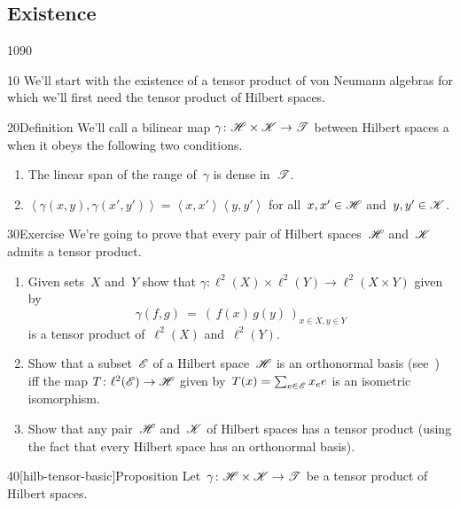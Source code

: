 \subsection{Existence}
\begin{parsec}{1090}%
\begin{point}{10}%
We'll start with the existence
of a tensor product of von Neumann algebras
for which we'll first need the tensor product
of Hilbert spaces.
\end{point}
\begin{point}{20}{Definition}%
We'll call a bilinear map $\gamma\colon \mathscr{H}\times\mathscr{K}\to\mathscr{T}$
between Hilbert spaces
a %
when it obeys the following two conditions.
\begin{enumerate}
\item
The linear span of the range of~$\gamma$ is dense in~$\mathscr{T}$.
\item
$\left<\gamma(x,y),\gamma(x',y')\right>
= \left<x,x'\right> \left<y,y'\right>$
for all~$x,x'\in\mathscr{H}$ and~$y,y'\in\mathscr{K}$.
\end{enumerate}
\spacingfix
\end{point}%
\begin{point}{30}{Exercise}%
We're going to prove that every pair of Hilbert
spaces~$\mathscr{H}$ and~$\mathscr{K}$ admits
a tensor product.
\begin{enumerate}
\item
Given sets~$X$ and~$Y$
show that  $\gamma\colon\ell^2(X)\times \ell^2(Y)\to \ell^2(X\times Y)$
given by
\begin{equation*}
	\gamma(f,g)\ = \ (\,f(x)\,g(y)\,)_{x\in X,y\in Y}
\end{equation*}
is a tensor product of~$\ell^2(X)$ and~$\ell^2(Y)$.
\item
Show that a subset~$\mathscr{E}$ of a Hilbert space~$\mathscr{H}$
is an orthonormal basis (see~) iff
the map $T\colon \ell^2(\mathscr{E})\to\mathscr{H}$
given by~$T(x)=\sum_{e\in\mathscr{E}} x_e e$
is an isometric isomorphism.
\item
Show that any pair~$\mathscr{H}$ and~$\mathscr{K}$
of Hilbert spaces has a tensor product
(using the fact that every Hilbert space
has an orthonormal basis).
\end{enumerate}
\spacingfix%
\end{point}%
\begin{point}{40}[hilb-tensor-basic]{Proposition}%
Let~$\gamma\colon \mathscr{H}\times\mathscr{K}\to\mathscr{T}$
be a tensor product
of Hilbert spaces.

\end{point}
\end{parsec}
